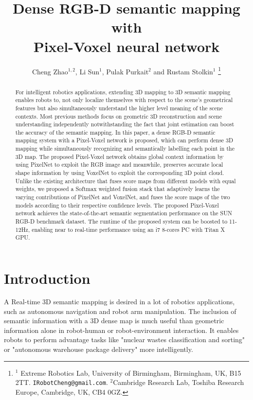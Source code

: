 \documentclass[letterpaper, 10 pt, conference]{ieeeconf}
\title{\LARGE \bf Dense RGB-D semantic mapping with\\
 Pixel-Voxel neural network}
\author{Cheng Zhao$^{1,2}$, Li Sun$^{1}$, Pulak Purkait$^{2}$ and Rustam Stolkin$^{1}$%
\thanks{$^{1}$ Extreme Robotics Lab, University of Birmingham, Birmingham, UK, B15 2TT.
        {\tt\small IRobotCheng@gmail.com}. $^{2}$Cambridge Research Lab, Toshiba Research Europe, Cambridge, UK, CB4 0GZ.}%
}
\begin{document}
              
\maketitle
\thispagestyle{empty}
\pagestyle{empty}
\begin{abstract}
For intelligent robotics applications, extending 3D mapping to 3D semantic mapping enables robots to, not only localize themselves with respect to the scene's geometrical features but also simultaneously understand the higher level meaning of the scene contexts. Most previous methods focus on geometric 3D reconstruction and scene understanding independently notwithstanding the fact that joint estimation can boost the accuracy of the semantic mapping. In this paper, a dense RGB-D semantic mapping system with a Pixel-Voxel network is proposed, which can perform dense 3D mapping while simultaneously recognizing and semantically labelling each point in the 3D map. The proposed Pixel-Voxel network obtains global context information by using PixelNet to exploit the RGB image and meanwhile, preserves accurate local shape information by using VoxelNet to exploit the corresponding 3D point cloud. Unlike the existing architecture that fuses score maps from different models with equal weights, we proposed a Softmax weighted fusion stack that adaptively learns the varying contributions of PixelNet and VoxelNet, and fuses the score maps of the two models according to their respective confidence levels. The proposed Pixel-Voxel network achieves the state-of-the-art semantic segmentation performance on the SUN RGB-D benchmark dataset. The runtime of the proposed system can be boosted to 11-12Hz, enabling near to real-time performance using an i7 8-cores PC with Titan X GPU.
\end{abstract}
\section{Introduction}\label{sec:1}
A Real-time 3D semantic mapping is desired in a lot of robotics applications, such as autonomous navigation and robot arm manipulation. The inclusion of semantic information with a 3D dense map is much useful than geometric information alone in robot-human or robot-environment interaction. It enables robots to perform advantage tasks like "nuclear wastes classification and sorting" or "autonomous warehouse package delivery" more intelligently.  
\end{document}
